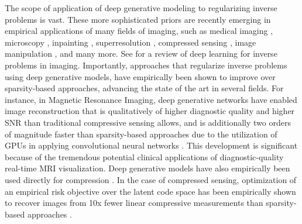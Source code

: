 \documentclass[11pt]{article}
\begin{document}
The scope of application of deep generative modeling to regularizing inverse problems is vast. These more sophisticated priors are recently emerging in empirical applications of many fields of imaging, such as medical imaging \cite{yang2017dagan, kelly2017deep, hammernik2017learning, quan2017compressed, dar2017transfer, adler2018learned,moeskops2017adversarial,wolterink2017generative, nie2017medical, mahmood2017unsupervised, kohl2017adversarial, mahapatra2017retinal, dai2017scan, xue2017segan}, microscopy \cite{rivenson2017deep},  inpainting \cite{mao2016image, yeh2017semantic}, superresolution \cite{sonderby2016amortised, ledig2016photo,johnson2016perceptual}, compressed sensing \cite{lohit2017convolutional, liu2017high, mousavi2015deep, mousavi2017learning}, image manipulation \cite{zhu2016generative}, and many more.  See \cite{lucas2018using} for a review of deep learning for inverse problems in imaging. Importantly, approaches that regularize inverse problems using deep generative models, have empirically been shown to improve over sparsity-based approaches, advancing the state of the art in several fields. For instance, in Magnetic Resonance Imaging, deep generative networks have enabled image reconstruction that is qualitatively of higher diagnostic quality and higher SNR than traditional compressive sensing allows, and is additionally two orders of magnitude faster than sparsity-based approaches due to the utilization of GPUs in applying convolutional neural networks \cite{mardani2017deep, mardani2017recurrent}.  This development is significant because of the tremendous potential clinical applications of diagnostic-quality real-time MRI visualization.  
Deep generative models have also empirically been used directly for compression \cite{rippel2017real}. 
In the case of compressed sensing, optimization of an empirical risk objective over the latent code space has been empirically shown to recover images from 10x fewer linear compressive measurements than sparsity-based approaches \cite{Price}. 
\end{document}
